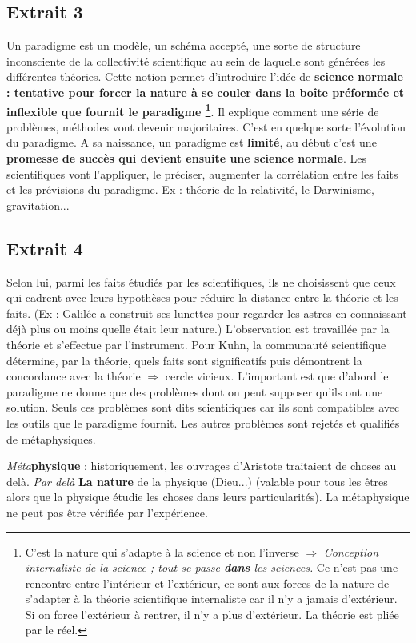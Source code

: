 \documentclass[11pt,a4paper]{article} %
\begin{document}
\subsection{Extrait 3}
Un paradigme est un modèle, un schéma accepté, une sorte de structure inconsciente de la collectivité scientifique au sein de laquelle sont générées les différentes théories.
Cette notion permet d'introduire l'idée de \textbf{science normale : tentative pour forcer la nature à se couler dans la boîte préformée et inflexible que fournit le paradigme
\footnote{C'est la nature qui s'adapte à la science et non l'inverse $\Rightarrow$ \emph{Conception internaliste de la science ; tout se passe \textbf{dans} les sciences.} Ce n'est pas une rencontre entre l'intérieur et l'extérieur, ce sont aux forces de la nature de s'adapter à la théorie scientifique internaliste car il n'y a jamais d'extérieur.
Si on force l'extérieur à rentrer, il n'y a plus d'extérieur.
La théorie est pliée par le réel.}}.
Il explique comment une série de problèmes, méthodes vont devenir majoritaires.
C'est en quelque sorte l'évolution du paradigme.
A sa naissance, un paradigme est \textbf{limité}, au début c'est une \textbf{promesse de succès qui devient ensuite une science normale}.
Les scientifiques vont l'appliquer, le préciser, augmenter la corrélation entre les faits et les prévisions du paradigme.
Ex : théorie de la relativité, le Darwinisme, gravitation...
\subsection{Extrait 4}
Selon lui, parmi les faits étudiés par les scientifiques, ils ne choisissent que ceux qui cadrent avec leurs hypothèses pour réduire la distance entre la théorie et les faits.
(Ex : Galilée a construit ses lunettes pour regarder les astres en connaissant déjà plus ou moins quelle était leur nature.) L'observation est travaillée par la théorie et s'effectue par l'instrument.
Pour Kuhn, la communauté scientifique détermine, par la théorie, quels faits sont significatifs puis démontrent la concordance avec la théorie $\Rightarrow$ cercle vicieux.
L'important est que d'abord le paradigme ne donne que des problèmes dont on peut supposer qu'ils ont une solution.
Seuls ces problèmes  sont dits scientifiques car ils sont compatibles avec les outils que le paradigme fournit.
Les autres problèmes sont rejetés et qualifiés de métaphysiques.

\emph{Méta}\textbf{physique} : historiquement, les ouvrages d'Aristote traitaient de choses au delà.
\emph{Par delà} \textbf{La nature} de la physique (Dieu...) (valable pour tous les êtres alors que la physique étudie les choses dans leurs particularités).
La métaphysique ne peut pas être vérifiée par l'expérience.
\end{document}
